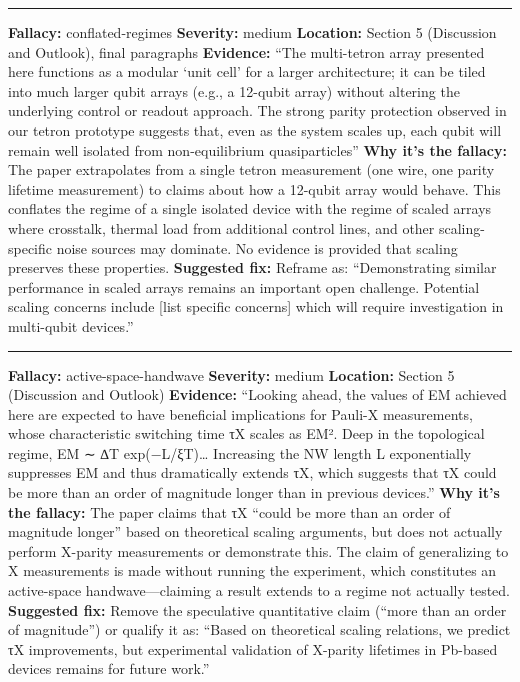 \documentclass[10pt,letterpaper]{article}
\begin{document}
\begin{center}\rule{0.5\linewidth}{0.5pt}\end{center}

\textbf{Fallacy:} conflated-regimes
\textbf{Severity:} medium
\textbf{Location:} Section 5 (Discussion and Outlook), final paragraphs
\textbf{Evidence:} ``The multi-tetron array presented here functions as a modular `unit cell' for a larger architecture; it can be tiled into much larger qubit arrays (e.g., a 12-qubit array) without altering the underlying control or readout approach. The strong parity protection observed in our tetron prototype suggests that, even as the system scales up, each qubit will remain well isolated from non-equilibrium quasiparticles''
\textbf{Why it's the fallacy:} The paper extrapolates from a single tetron measurement (one wire, one parity lifetime measurement) to claims about how a 12-qubit array would behave. This conflates the regime of a single isolated device with the regime of scaled arrays where crosstalk, thermal load from additional control lines, and other scaling-specific noise sources may dominate. No evidence is provided that scaling preserves these properties.
\textbf{Suggested fix:} Reframe as: ``Demonstrating similar performance in scaled arrays remains an important open challenge. Potential scaling concerns include {[}list specific concerns{]} which will require investigation in multi-qubit devices.''

\begin{center}\rule{0.5\linewidth}{0.5pt}\end{center}

\textbf{Fallacy:} active-space-handwave
\textbf{Severity:} medium
\textbf{Location:} Section 5 (Discussion and Outlook)
\textbf{Evidence:} ``Looking ahead, the values of EM achieved here are expected to have beneficial implications for Pauli-X measurements, whose characteristic switching time τX scales as EM². Deep in the topological regime, EM ∼ ∆T exp(−L/ξT)\ldots{} Increasing the NW length L exponentially suppresses EM and thus dramatically extends τX, which suggests that τX could be more than an order of magnitude longer than in previous devices.''
\textbf{Why it's the fallacy:} The paper claims that τX ``could be more than an order of magnitude longer'' based on theoretical scaling arguments, but does not actually perform X-parity measurements or demonstrate this. The claim of generalizing to X measurements is made without running the experiment, which constitutes an active-space handwave---claiming a result extends to a regime not actually tested.
\textbf{Suggested fix:} Remove the speculative quantitative claim (``more than an order of magnitude'') or qualify it as: ``Based on theoretical scaling relations, we predict τX improvements, but experimental validation of X-parity lifetimes in Pb-based devices remains for future work.''
\end{document}
